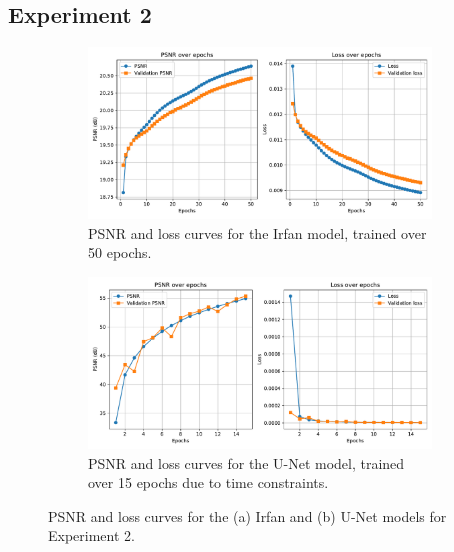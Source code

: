 \newpage
\subsection{Experiment 2}

\vfill

\begin{figure}[htbp]
    \centering
    \begin{subfigure}{\textwidth}
        \centering
        \includegraphics[width=\textwidth]{img/ch6/in_eq_out/irfan/psnr_loss_curves.pdf}
        \caption{PSNR and loss curves for the Irfan model, trained over 50 epochs.}
        \label{fig:denoising-exp2-curves-irfan}
    \end{subfigure}
    
    \vspace{0.5cm}
    
    \begin{subfigure}{\textwidth}
        \centering
        \includegraphics[width=\textwidth]{img/ch6/in_eq_out/unet/psnr_loss_curves.pdf}
        \caption{PSNR and loss curves for the U-Net model, trained over 15 epochs due to time constraints.}
        \label{fig:denoising-exp2-curves-unet}
    \end{subfigure}
    \caption{PSNR and loss curves for the (a) Irfan and (b) U-Net models for Experiment 2.}
    \label{fig:denoising-exp2-curves}
\end{figure}

